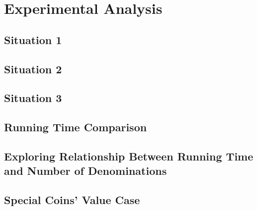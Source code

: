 \documentclass[11pt]{scrreprt}
\begin{document}
\chapter{Experimental Analysis}

\section{Situation 1}

\section{Situation 2}

\section{Situation 3}

\section{Running Time Comparison}

\section{Exploring Relationship Between Running Time and Number of Denominations}

\section{Special Coins' Value Case}
\end{document}
